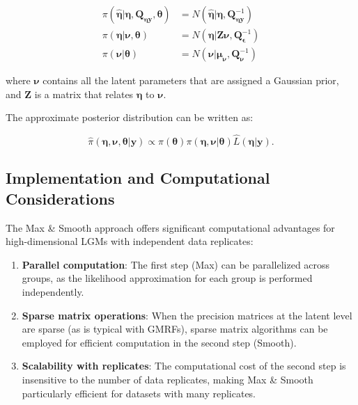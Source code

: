 \begin{align}
    \pi(\hat{\boldsymbol{\eta}}|\boldsymbol{\eta}, \mathbf{Q}_{\boldsymbol{\eta}\mathbf{y}}, \boldsymbol{\theta}) &= N(\hat{\boldsymbol{\eta}}|\boldsymbol{\eta}, \mathbf{Q}_{\boldsymbol{\eta}\mathbf{y}}^{-1}) \\
    \pi(\boldsymbol{\eta}|\boldsymbol{\nu}, \boldsymbol{\theta}) &= N(\boldsymbol{\eta}|\mathbf{Z}\boldsymbol{\nu}, \mathbf{Q}_{\boldsymbol{\epsilon}}^{-1}) \\
    \pi(\boldsymbol{\nu}|\boldsymbol{\theta}) &= N(\boldsymbol{\nu}|\boldsymbol{\mu}_{\boldsymbol{\nu}}, \mathbf{Q}_{\boldsymbol{\nu}}^{-1})
\end{align}

where $\boldsymbol{\nu}$ contains all the latent parameters that are assigned a Gaussian prior, and $\mathbf{Z}$ is a matrix that relates $\boldsymbol{\eta}$ to $\boldsymbol{\nu}$.

The approximate posterior distribution can be written as:

\begin{equation}
    \hat{\pi}(\boldsymbol{\eta}, \boldsymbol{\nu}, \boldsymbol{\theta}|\mathbf{y}) \propto \pi(\boldsymbol{\theta}) \pi(\boldsymbol{\eta}, \boldsymbol{\nu}|\boldsymbol{\theta}) \hat{L}(\boldsymbol{\eta}|\mathbf{y}).
\end{equation}

\subsection{Implementation and Computational Considerations} \label{subsec:ms-implementation}
The Max \& Smooth approach offers significant computational advantages for high-dimensional LGMs with independent data replicates:

\begin{enumerate}
    \item \textbf{Parallel computation}: The first step (Max) can be parallelized across groups, as the likelihood approximation for each group is performed independently.

    \item \textbf{Sparse matrix operations}: When the precision matrices at the latent level are sparse (as is typical with GMRFs), sparse matrix algorithms can be employed for efficient computation in the second step (Smooth).

    \item \textbf{Scalability with replicates}: The computational cost of the second step is insensitive to the number of data replicates, making Max \& Smooth particularly efficient for datasets with many replicates.
\end{enumerate}

